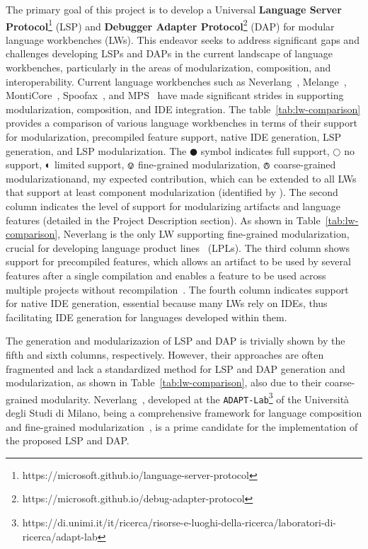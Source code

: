 The primary goal of this project is to develop a Universal \textbf{Language Server Protocol}\footnote{https://microsoft.github.io/language-server-protocol} (LSP) and \textbf{Debugger Adapter Protocol}\footnote{https://microsoft.github.io/debug-adapter-protocol} (DAP) for modular language workbenches (LWs). This endeavor seeks to address significant gaps and challenges developing LSPs and DAPs in the current landscape of language workbenches, particularly in the areas of modularization, composition, and interoperability. Current language workbenches such as Neverlang~\cite{Cazzola20}, Melange~\cite{Degueule15}, MontiCore~\cite{Krahn10}, Spoofax~\cite{Visser10}, and MPS~\cite{Volter11, Voelter12} have made significant strides in supporting modularization, composition, and IDE integration.
The table~\ref{tab:lw-comparison} provides a comparison of various language workbenches in terms of their support for modularization, precompiled feature support, native IDE generation, LSP generation, and LSP modularization. The $\CIRCLE$ symbol indicates full support, $\Circle$ no support, $\LEFTcircle$ limited support, $\circledvee$ fine-grained modularization, $\circledwedge$ coarse-grained modularizationand, \FiveStarConvex my expected contribution, which can be extended to all LWs that support at least component modularization (identified by ).
The second column indicates the level of support for modularizing artifacts and language features (detailed in the Project Description section). As shown in Table~\ref{tab:lw-comparison}, Neverlang is the only LW supporting fine-grained modularization, crucial for developing language product lines~\cite{Cazzola21b, Cazzola15f} (LPLs). The third column shows support for precompiled features, which allows an artifact to be used by several features after a single compilation and enables a feature to be used across multiple projects without recompilation~\cite{Leduc20}. The fourth column indicates support for native IDE generation, essential because many LWs rely on IDEs, thus facilitating IDE generation for languages developed within them.

The generation and modularizazion of LSP and DAP is trivially shown by the fifth and sixth columns, respectively.
However, their approaches are often fragmented and lack a standardized method for LSP and DAP generation and modularization, as shown in Table~\ref{tab:lw-comparison}, also due to their coarse-grained modularity.
Neverlang~\cite{Cazzola15c, Cazzola14c}, developed at the \texttt{ADAPT-Lab}\footnote{https://di.unimi.it/it/ricerca/risorse-e-luoghi-della-ricerca/laboratori-di-ricerca/adapt-lab} of the Università degli Studi di Milano, being a comprehensive framework for language composition and fine-grained modularization~\cite{Cazzola15f, Cazzola21b}, is a prime candidate for the implementation of the proposed LSP and DAP.

